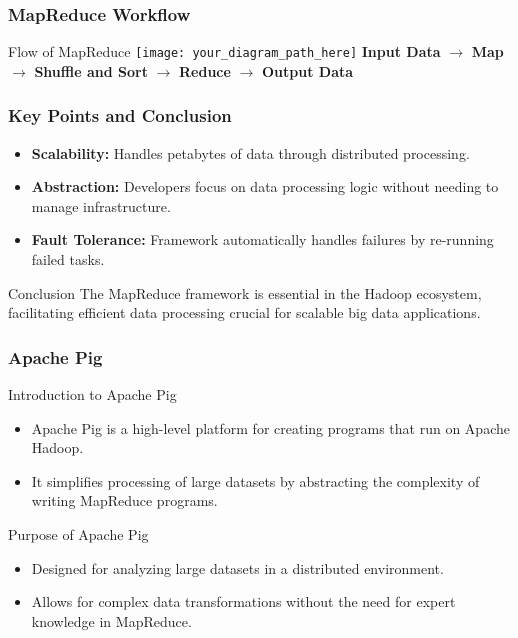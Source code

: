 \documentclass[aspectratio=169]{beamer}
\begin{document}
\begin{frame}
  \frametitle{MapReduce Workflow}
  \begin{block}{Flow of MapReduce}
    \texttt{[image: your\_diagram\_path\_here]} %
    \newline
    \textbf{Input Data} $\rightarrow$ \textbf{Map} $\rightarrow$ \textbf{Shuffle and Sort} $\rightarrow$ \textbf{Reduce} $\rightarrow$ \textbf{Output Data}
  \end{block}
\end{frame}

\begin{frame}
  \frametitle{Key Points and Conclusion}
  \begin{itemize}
    \item \textbf{Scalability:} Handles petabytes of data through distributed processing.
    
    \item \textbf{Abstraction:} Developers focus on data processing logic without needing to manage infrastructure.
    
    \item \textbf{Fault Tolerance:} Framework automatically handles failures by re-running failed tasks.
  \end{itemize}
  \begin{block}{Conclusion}
    The MapReduce framework is essential in the Hadoop ecosystem, facilitating efficient data processing crucial for scalable big data applications.
  \end{block}
\end{frame}

\begin{frame}[fragile]
    \frametitle{Apache Pig}
    \begin{block}{Introduction to Apache Pig}
        \begin{itemize}
            \item Apache Pig is a high-level platform for creating programs that run on Apache Hadoop.
            \item It simplifies processing of large datasets by abstracting the complexity of writing MapReduce programs.
        \end{itemize}
    \end{block}
    
    \begin{block}{Purpose of Apache Pig}
        \begin{itemize}
            \item Designed for analyzing large datasets in a distributed environment.
            \item Allows for complex data transformations without the need for expert knowledge in MapReduce.
        \end{itemize}
    \end{block}
\end{frame}
\end{document}
